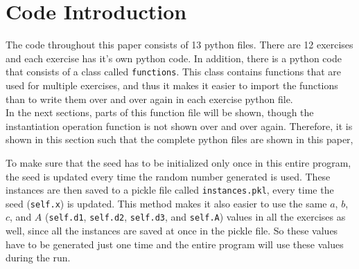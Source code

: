\section*{Code Introduction}

The code throughout this paper consists of 13 python files. There are 12 exercises and each exercise has it's own python code. In addition, there is a python code that consists of a class called \texttt{functions}. This class contains functions that are used for multiple exercises, and thus it makes it easier to import the functions than to write them over and over again in each exercise python file. \\
In the next sections, parts of this function file will be shown, though the instantiation operation function is not shown over and over again. Therefore, it is shown in this section such that the complete python files are shown in this paper,

To make sure that the seed has to be initialized only once in this entire program, the seed is updated every time the random number generated is used. These instances are then saved to a pickle file called \texttt{instances.pkl}, every time the seed (\texttt{self.x}) is updated. This method makes it also easier to use the same $a$, $b$, $c$, and $A$ (\texttt{self.d1}, \texttt{self.d2}, \texttt{self.d3}, and \texttt{self.A}) values in all the exercises as well, since all the instances are saved at once in the pickle file. So these values have to be generated just one time and the entire program will use these values during the run.